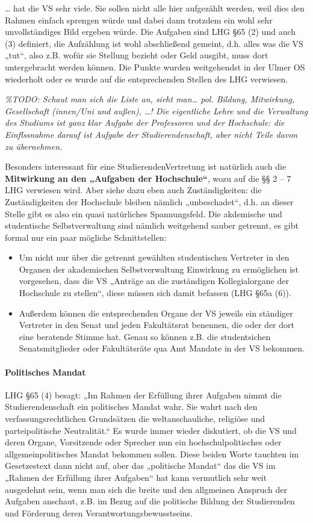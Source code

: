 \documentclass[
10pt,
a4paper,
twoside,								%
titlepage=false,							%
draft=false								%
]{scrartcl}
\begin{document}
… hat die VS sehr viele. Sie sollen nicht alle hier aufgezählt werden, weil dies den Rahmen einfach sprengen würde und dabei dann trotzdem ein wohl sehr unvollständiges Bild ergeben würde. Die Aufgaben sind LHG §65 (2) und auch (3) definiert, die Aufzählung ist wohl abschließend gemeint, d.h. alles was die VS „tut“, also z.B. wofür sie Stellung bezieht oder Geld ausgibt, muss dort untergebracht werden können. Die Punkte wurden weitgehendst in der Ulmer OS wiederholt oder es wurde auf die entsprechenden Stellen des LHG verwiesen.

\textit{\%TODO: Schaut man sich die Liste an, sieht man… pol. Bildung, Mitwirkung, Gesellschaft (innen/Uni und außen), …! Die eigentliche Lehre und die Verwaltung des Studiums ist ganz klar Aufgabe der Professoren und der Hochschule: die Einflssnahme darauf ist Aufgabe der Studierendenschaft, aber nicht Teile davon zu übernehmen.}

Besonders interessant für eine StudierendenVertretung ist natürlich auch die \textbf{Mitwirkung an den „Aufgaben der Hochschule“}, wozu auf die §§ 2 – 7 LHG verwiesen wird. Aber siehe dazu eben auch Zuständigkeiten: die Zuständigkeiten der Hochschule bleiben nämlich „unbeschadet“, d.h. an dieser Stelle gibt es also ein quasi natürliches Spannungsfeld. Die akdemische und studentische Selbstverwaltung sind nämlich weitgehend sauber getrennt, es gibt formal nur ein paar mögliche Schnittstellen:
\begin{itemize}
	\item Um nicht nur über die getrennt gewählten studentischen Vertreter in den Organen der akademischen Selbstverwaltung Einwirkung zu ermöglichen ist vorgesehen, dass die VS „Anträge an die zuständigen Kollegialorgane der Hochschule zu stellen“, diese müssen sich damit befassen (LHG §65a (6)). 
	\item Außerdem können die entsprechenden Organe der VS jeweils ein ständiger Vertreter in den Senat und jeden Fakultätsrat benennen, die oder der dort eine beratende Stimme hat. Genau so können z.B. die studentsichen Senatsmitglieder oder Fakultätsräte qua Amt Mandate in der VS bekommen.
\end{itemize}


\paragraph{Politisches Mandat}

LHG §65 (4) besagt: „Im Rahmen der Erfüllung ihrer Aufgaben nimmt die Studierendenschaft ein politisches Mandat wahr. Sie wahrt nach den verfassungsrechtlichen Grundsätzen die weltanschauliche, religiöse und parteipolitische Neutralität.“ Es wurde immer wieder diskutiert, ob die VS und deren Organe, Vorsitzende oder Sprecher nun ein hochschulpolitisches oder allgemeinpolitisches Mandat bekommen sollen. Diese beiden Worte tauchten im Gesetzestext dann nicht auf, aber das „politische Mandat“ das die VS im „Rahmen der Erfüllung ihrer Aufgaben“ hat kann vermutlich sehr weit ausgedehnt sein, wenn man sich die breite und den allgmeinen Anspruch der Aufgaben anschaut, z.B. im Bezug auf die politische Bildung der Studierenden und Förderung deren Verantwortungsbewusstseins.
\end{document}
